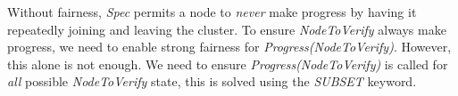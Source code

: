 Without fairness, \textit{Spec} permits a node to \textit{never} make
progress by having it repeatedly joining and leaving the cluster. To ensure 
\textit{NodeToVerify} always make progress, we need to enable strong fairness 
for \textit{Progress(NodeToVerify)}. However, this alone is not enough. We need 
to ensure \textit{Progress(NodeToVerify)} is called for \textit{all} possible
\textit{NodeToVerify} state, this is solved using the \textit{SUBSET} keyword.

% 
